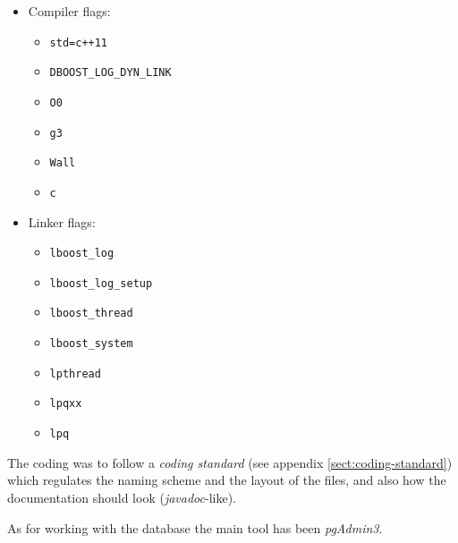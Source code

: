 \documentclass[../main.tex]{subfiles}
\begin{document}
\begin{itemize}
    \item Compiler flags:
    \begin{itemize}
        \item \texttt{std=c++11}
        \item \texttt{DBOOST\_LOG\_DYN\_LINK}
        \item \texttt{O0}
        \item \texttt{g3}
        \item \texttt{Wall}
        \item \texttt{c}
    \end{itemize}  
    \item Linker flags: 
    \begin{itemize}
        \item \texttt{lboost\_log}
        \item \texttt{lboost\_log\_setup}
        \item \texttt{lboost\_thread}
        \item \texttt{lboost\_system}
        \item \texttt{lpthread}
        \item \texttt{lpqxx}
        \item \texttt{lpq}
    \end{itemize}
\end{itemize}

\vspace{1em}
\noindent
The coding was to follow a \textit{coding standard} (see appendix \ref{sect:coding-standard}) which regulates the naming scheme and the layout of the files, and also how the documentation should look (\textit{javadoc}-like).

As for working with the database the main tool has been \textit{pgAdmin3}.
\end{document}
